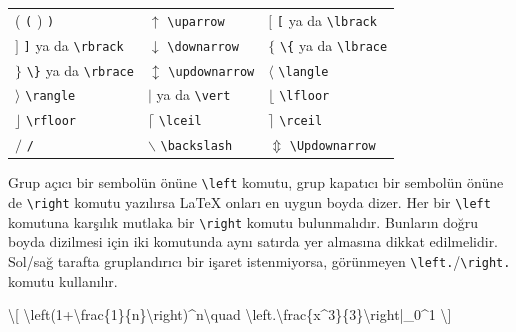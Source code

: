 \documentclass[
  10pt,
]{scrbook}
\newenvironment{Shaded}{\begin{snugshade}}{\end{snugshade}}
\newcommand{\SpecialCharTok}[1]{\textcolor[rgb]{0.00,0.00,0.00}{#1}}
\newcommand{\SpecialStringTok}[1]{\textcolor[rgb]{0.31,0.60,0.02}{#1}}
\theoremstyle{definition}
\theoremstyle{definition}
\theoremstyle{definition}
\theoremstyle{definition}
\theoremstyle{remark}
\begin{document}
\begin{longtable}[]{@{}
  >{\raggedright\arraybackslash}p{}
  >{\raggedright\arraybackslash}p{}
  >{\raggedright\arraybackslash}p{}@{}}
\toprule
\endhead
( \texttt{(} ) \texttt{)} & \(\uparrow\) \texttt{\textbackslash{}uparrow} & \([\) \texttt{{[}} ya da \texttt{\textbackslash{}lbrack} \\
\(]\) \texttt{{]}} ya da \texttt{\textbackslash{}rbrack} & \(\downarrow\) \texttt{\textbackslash{}downarrow} & \(\lbrace\) \texttt{\textbackslash{}\{} ya da \texttt{\textbackslash{}lbrace} \\
\(\rbrace\) \texttt{\textbackslash{}\}} ya da \texttt{\textbackslash{}rbrace} & \(\updownarrow\) \texttt{\textbackslash{}updownarrow} & \(\langle\) \texttt{\textbackslash{}langle} \\
\(\rangle\) \texttt{\textbackslash{}rangle} & \(\vert\) \texttt{\textbar{}} ya da \texttt{\textbackslash{}vert} & \(\lfloor\) \texttt{\textbackslash{}lfloor} \\
\(\rfloor\) \texttt{\textbackslash{}rfloor} & \(\lceil\) \texttt{\textbackslash{}lceil} & \(\rceil\) \texttt{\textbackslash{}rceil} \\
\(/\) \texttt{/} & \(\backslash\) \texttt{\textbackslash{}backslash} & \(\Updownarrow\) \texttt{\textbackslash{}Updownarrow} \\
\bottomrule
\end{longtable}

Grup açıcı bir sembolün önüne \texttt{\textbackslash{}left} komutu, grup kapatıcı bir sembolün önüne de \texttt{\textbackslash{}right} komutu yazılırsa LaTeX onları en uygun boyda dizer. Her bir \texttt{\textbackslash{}left} komutuna karşılık mutlaka bir \texttt{\textbackslash{}right} komutu bulunmalıdır. Bunların doğru boyda dizilmesi için iki komutunda aynı satırda yer almasına dikkat edilmelidir. Sol/sağ tarafta gruplandırıcı bir işaret istenmiyorsa, görünmeyen \texttt{\textbackslash{}left.}/\texttt{\textbackslash{}right.} komutu kullanılır.

\begin{Shaded}
\begin{Highlighting}[]
\SpecialStringTok{\textbackslash{}[}
\SpecialCharTok{\textbackslash{}left}\SpecialStringTok{(1+}\SpecialCharTok{\textbackslash{}frac}\SpecialStringTok{\{1\}\{n\}}\SpecialCharTok{\textbackslash{}right}\SpecialStringTok{)\^{}n}\SpecialCharTok{\textbackslash{}quad}
\SpecialCharTok{\textbackslash{}left}\SpecialStringTok{.}\SpecialCharTok{\textbackslash{}frac}\SpecialStringTok{\{x\^{}3\}\{3\}}\SpecialCharTok{\textbackslash{}right}\SpecialStringTok{|\_0\^{}1}
\SpecialStringTok{\textbackslash{}]}
\end{Highlighting}
\end{Shaded}
\end{document}
